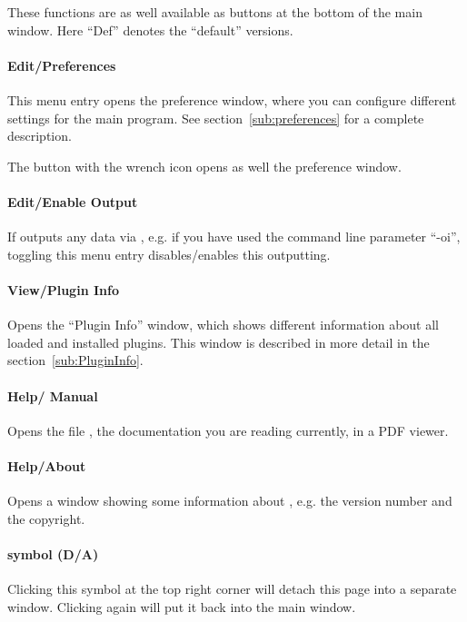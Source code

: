These functions are as well available as buttons at the bottom of
the main window. Here ``Def'' denotes the ``default'' versions.

\paragraph{Edit/Preferences}
This menu entry opens the preference window, where you can configure
different settings for the \icewing{} main program. See
section~\ref{sub:preferences} for a complete description.

The button with the wrench icon opens as well the preference
window.

\paragraph{Edit/Enable \dacs{} Output}
If \icewing{} outputs any data via \dacs{}, e.g. if you have used
the command line parameter ``-oi'', toggling this menu entry
disables/enables this outputting.

\paragraph{View/Plugin Info}
Opens the ``Plugin Info'' window, which shows different information
about all loaded and installed plugins. This window is described in
more detail in the section~\ref{sub:PluginInfo}.

\paragraph{Help/\icewing{} Manual}
Opens the file , the \icewing{} documentation you
are reading currently, in a PDF viewer.

\paragraph{Help/About \icewing{}}
Opens a window showing some information about \icewing{}, e.g. the
version number and the copyright.

\paragraph{ symbol (D/A)}

Clicking this symbol at the top right corner will detach this page
into a separate window. Clicking again will put it back into the
\icewing{} main window.

